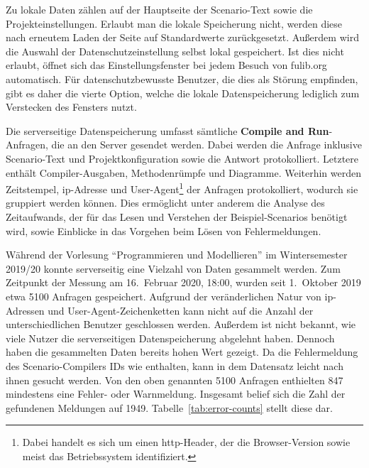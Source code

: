 Zu lokale Daten zählen auf der Hauptseite der Scenario-Text sowie die Projekteinstellungen.
Erlaubt man die lokale Speicherung nicht, werden diese nach erneutem Laden der Seite auf Standardwerte zurückgesetzt.
Außerdem wird die Auswahl der Datenschutzeinstellung selbst lokal gespeichert.
Ist dies nicht erlaubt, öffnet sich das Einstellungsfenster bei jedem Besuch von fulib.org automatisch.
Für datenschutzbewusste Benutzer, die dies als Störung empfinden, gibt es daher die vierte Option, welche die lokale Datenspeicherung lediglich zum Verstecken des Fensters nutzt.

Die serverseitige Datenspeicherung umfasst sämtliche \textbf{Compile and Run}-Anfragen, die an den Server gesendet werden.
Dabei werden die Anfrage inklusive Scenario-Text und Projektkonfiguration sowie die Antwort protokolliert.
Letztere enthält Compiler-Ausgaben, Methodenrümpfe und Diagramme.
Weiterhin werden Zeitstempel, \ac{ip}-Adresse und User-Agent\footnote{Dabei handelt es sich um einen \ac{http}-Header, der die Browser-Version sowie meist das Betriebssystem identifiziert.} der Anfragen protokolliert, wodurch sie gruppiert werden können.
Dies ermöglicht unter anderem die Analyse des Zeitaufwands, der für das Lesen und Verstehen der Beispiel-Scenarios benötigt wird, sowie Einblicke in das Vorgehen beim Lösen von Fehlermeldungen.

Während der Vorlesung ``Programmieren und Modellieren'' im Wintersemester 2019/20 konnte serverseitig eine Vielzahl von Daten gesammelt werden.
Zum Zeitpunkt der Messung am 16.\ Februar 2020, 18:00, wurden seit 1.\ Oktober 2019 etwa 5100 Anfragen gespeichert.
Aufgrund der veränderlichen Natur von \ac{ip}-Adressen und User-Agent-Zeichenketten kann nicht auf die Anzahl der unterschiedlichen Benutzer geschlossen werden.
Außerdem ist nicht bekannt, wie viele Nutzer die serverseitigen Datenspeicherung abgelehnt haben.
Dennoch haben die gesammelten Daten bereits hohen Wert gezeigt.
Da die Fehlermeldung des Scenario-Compilers IDs wie  enthalten, kann in dem Datensatz leicht nach ihnen gesucht werden.
Von den oben genannten 5100 Anfragen enthielten 847 mindestens eine Fehler- oder Warnmeldung.
Insgesamt belief sich die Zahl der gefundenen Meldungen auf 1949.
Tabelle~\ref{tab:error-counts} stellt diese dar.

